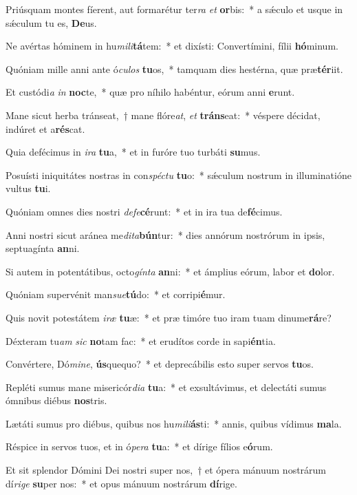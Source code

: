 \item Priúsquam montes fíerent, aut formarétur ter\textit{ra} \textit{et} \textbf{or}bis:~* a sǽculo et usque in sǽculum tu es, \textbf{De}us.
\item Ne avértas hóminem in hu\textit{mi}\textit{li}\textbf{tá}tem:~* et dixísti: Convertímini, fílii \textbf{hó}minum.
\item Quóniam mille anni ante ó\textit{cu}\textit{los} \textbf{tu}os,~* tamquam dies hestérna, quæ præ\textbf{tér}iit.
\item Et custódi\textit{a} \textit{in} \textbf{noc}te,~* quæ pro níhilo habéntur, eórum anni \textbf{e}runt.
\item Mane sicut herba tránseat,~† mane flóre\textit{at}, \textit{et} \textbf{tráns}eat:~* véspere décidat, indúret et a\textbf{rés}cat.
\item Quia defécimus in \textit{i}\textit{ra} \textbf{tu}a,~* et in furóre tuo turbáti \textbf{su}mus.
\item Posuísti iniquitátes nostras in con\textit{spéc}\textit{tu} \textbf{tu}o:~* sǽculum nostrum in illuminatióne vultus \textbf{tu}i.
\item Quóniam omnes dies nostri \textit{de}\textit{fe}\textbf{cé}runt:~* et in ira tua de\textbf{fé}cimus.
\item Anni nostri sicut aránea me\textit{di}\textit{ta}\textbf{bún}tur:~* dies annórum nostrórum in ipsis, septuagínta \textbf{an}ni.
\item Si autem in potentátibus, octo\textit{gín}\textit{ta} \textbf{an}ni:~* et ámplius eórum, labor et \textbf{do}lor.
\item Quóniam supervénit man\textit{su}\textit{e}\textbf{tú}do:~* et corripi\textbf{é}mur.
\item Quis novit potestátem \textit{i}\textit{ræ} \textbf{tu}æ:~* et præ timóre tuo iram tuam dinume\textbf{rá}re?
\item Déxteram tu\textit{am} \textit{sic} \textbf{no}tam fac:~* et erudítos corde in sapi\textbf{én}tia.
\item Convértere, Dó\textit{mi}\textit{ne}, \textbf{ús}quequo?~* et deprecábilis esto super servos \textbf{tu}os.
\item Repléti sumus mane misericór\textit{di}\textit{a} \textbf{tu}a:~* et exsultávimus, et delectáti sumus ómnibus diébus \textbf{nos}tris.
\item Lætáti sumus pro diébus, quibus nos hu\textit{mi}\textit{li}\textbf{ás}ti:~* annis, quibus vídimus \textbf{ma}la.
\item Réspice in servos tuos, et in ó\textit{pe}\textit{ra} \textbf{tu}a:~* et dírige fílios e\textbf{ó}rum.
\item Et sit splendor Dómini Dei nostri super nos,~† et ópera mánuum nostrárum dí\textit{ri}\textit{ge} \textbf{su}per nos:~* et opus mánuum nostrárum \textbf{dí}rige.
